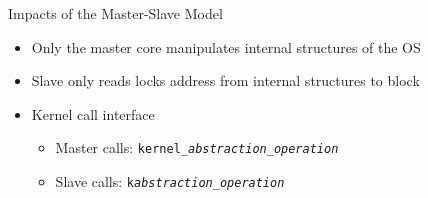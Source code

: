 		\begin{frame}[fragile]{Impacts of the Master-Slave Model}
			\begin{itemize}
				\item Only the master core manipulates internal structures of the OS
				\item Slave only reads locks address from internal structures to block
				\item Kernel call interface
				\begin{itemize}
					\item Master calls: \texttt{kernel\_\textit{abstraction}\_\textit{operation}}
					\item Slave calls: \texttt{k\textit{abstraction}\_\textit{operation}}
				\end{itemize}
			\end{itemize}

		\end{frame}

